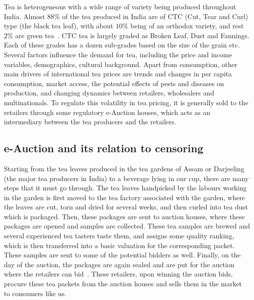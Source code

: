 \documentclass[a4paper,12pt]{article}
\begin{document}
Tea is heterogeneous with a wide range of variety being produced throughout India. Almost $88\%$ of the tea produced in India are of CTC (Cut, Tear and Curl) type (the black tea leaf), with about $10\%$ being of an orthodox variety, and rest $2\%$ are green tea~\cite{arya2013indian}. CTC tea is largely graded as Broken Leaf, Dust and Fannings. Each of these grades has a dozen sub-grades based on the size of the grain etc. Several factors
influence the demand for tea, including the price and income variables, demographics, cultural background. Apart from consumption, other main drivers of international tea prices are trends and changes in per capita consumption, market access, the potential effects of pests and diseases on production, and changing dynamics between retailers, wholesalers and multinationals. To regulate this volatility in tea pricing, it is generally sold to the retailers through some regulatory e-Auction houses, which acts as an intermediary between the tea producers and the retailers.

\subsection{e-Auction and its relation to censoring}
Starting from the tea leaves produced in the tea gardens of Assam or Darjeeling (the major tea producers in India) to a beverage lying in our cup, there are many steps that it must go through. The tea leaves handpicked by the labours working in the garden is first moved to the tea factory associated with the garden, where the leaves are cut, torn and dried for several weeks, and then curled into tea dust which is packaged. Then, these packages are sent to auction houses, where these packages are opened and samples are collected. These tea samples are brewed and several experienced tea tasters taste them, and assigns some quality ranking, which is then transferred into a basic valuation for the corresponding packet. These samples are sent to some of the potential bidders as well. Finally, on the day of the auction, the packages are again sealed and are put for the auction where the retailers can bid~\cite{eauction-annexture}. These retailers, upon winning the auction bids, procure these tea packets from the auction houses and sells them in the market to consumers like us.
\end{document}
